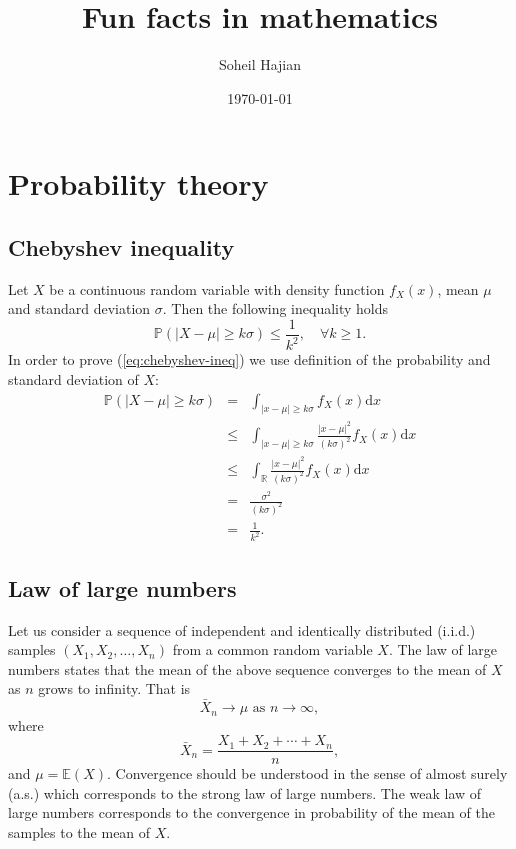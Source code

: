 \documentclass[11pt]{article}
\title{Fun facts in mathematics}
\author{Soheil Hajian}
\date{\today}
\newcommand{\R}{\mathbb{R}}
\newcommand{\Pro}{\mathbb{P}}
\newcommand{\dx}{\text{d}x}
\begin{document}
\maketitle	
\tableofcontents
\pagebreak

\section{Probability theory}
\subsection{Chebyshev inequality}
Let $X$ be a continuous random variable with density function
$f_X(x)$, mean $\mu$ and standard deviation $\sigma$. Then the
following inequality holds
\begin{equation} \label{eq:chebyshev-ineq}
  \Pro(|X-\mu| \geq k \sigma) \leq \frac{1}{k^2}, \quad \forall k \geq
  1.
\end{equation}
In order to prove (\ref{eq:chebyshev-ineq}) we use definition of
the probability and standard deviation of $X$:
\begin{equation}
  \begin{array}{rcl}
    \Pro(|X-\mu| \geq k \sigma) &=& \int_{|x-\mu|\geq k\sigma} f_X(x)
    \dx
    \\
    &\leq& \int_{|x-\mu|\geq k\sigma} \frac{|x-\mu|^2}{(k\sigma)^2}
    f_X(x) \dx
    \\
    &\leq& \int_{\R} \frac{|x-\mu|^2}{(k\sigma)^2}
    f_X(x) \dx
    \\
    &=& \frac{\sigma^2}{(k\sigma)^2}
    \\ &=& \frac{1}{k^2}.
  \end{array}
\end{equation}
%
\subsection{Law of large numbers}
Let us consider a sequence of independent and identically distributed
(i.i.d.) samples $(X_1, X_2, \dots, X_n)$ from a common random
variable $X$. The law of large numbers states that the mean of the
above sequence converges to the mean of $X$ as $n$ grows to
infinity. That is
\begin{equation}
  \bar{X}_n \rightarrow \mu \text{ as }
  n \rightarrow \infty,
\end{equation}
where
\begin{equation}
  \bar{X}_n = \frac{X_1 + X_2 + \cdots + X_n}{n},
\end{equation}
and $\mu = \mathbb{E}(X)$. Convergence should be understood in the
sense of almost surely (a.s.) which corresponds to the strong law of
large numbers. The weak law of large numbers corresponds to the
convergence in probability of the mean of the samples to the mean of
$X$.
\end{document}

